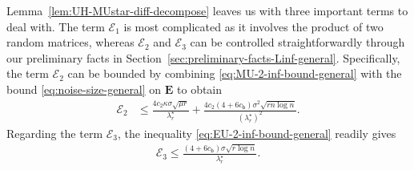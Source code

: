 Lemma~\ref{lem:UH-MUstar-diff-decompose} leaves us with three important terms to deal with. The term $\mathcal{E}_1$ is most complicated as it involves the product of two random matrices, whereas $\mathcal{E}_2$ and $\mathcal{E}_3$ can be controlled straightforwardly through our preliminary facts in Section~\ref{sec:preliminary-facts-Linf-general}.   Specifically,   the term $\mathcal{E}_2$ can be bounded by combining \eqref{eq:MU-2-inf-bound-general} with the bound \eqref{eq:noise-size-general} on $\bm{E}$ to obtain
%
%
%
\begin{align}
	\mathcal{E}_2 & \leq \frac{4c_{2}\kappa\sigma\sqrt{\mu r}}{\lambda_{r}^{\star}}+\frac{4c_{2}(4+6c_{\mathsf{b}})\sigma^{2}\sqrt{rn\log n}}{(\lambda_{r}^{\star})^{2}}.
	\label{eq:MUstar-E-norm-lambda2-bound}
\end{align}
%
Regarding the term $\mathcal{E}_3$, the inequality \eqref{eq:EU-2-inf-bound-general} readily gives
%
\begin{align}
	\mathcal{E}_3 \leq\frac{(4+6c_{\mathsf{b}} )\sigma\sqrt{r\log n}}{\lambda_{r}^{\star}}.
	\label{eq:E3-bound-general}
\end{align}
%




